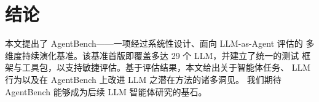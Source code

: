 
\section{结论}

本文提出了 AgentBench——一项经过系统性设计、面向 LLM-as-Agent 评估的
多维度持续演化基准。该基准首版即覆盖多达 29 个 LLM，并建立了统一的测试
框架与工具包，以支持敏捷评估。基于评估结果，本文给出关于智能体任务、
LLM 行为以及在 AgentBench 上改进 LLM 之潜在方法的诸多洞见。
我们期待 AgentBench 能够成为后续 LLM 智能体研究的基石。
